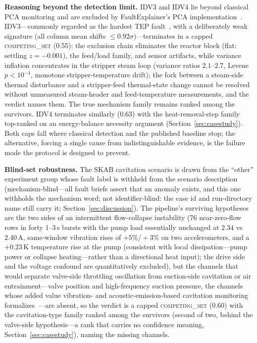 \documentclass[preprint,10pt]{elsarticle}
\begin{document}
\textbf{Reasoning beyond the detection limit.} IDV3 and IDV4 lie beyond classical PCA monitoring and are excluded by FaultExplainer's PCA implementation~\cite{russell2000delay,chiang2001fault,khan2024faultexplainer}. IDV3---commonly regarded as the hardest TEP fault~\cite{russell2000delay}, with a deliberately weak signature (all column mean shifts $\le 0.92\sigma$)---terminates in a capped \mbox{\textsc{competing\_set}} (0.55): the exclusion chain eliminates the reactor block (flat: settling $z{=}{-}0.001$), the feed/load family, and sensor artifacts, while variance inflation concentrates in the stripper steam loop (variance ratios $2.1$--$2.7$, Levene $p{<}10^{-4}$, monotone stripper-temperature drift); the fork between a steam-side thermal disturbance and a stripper-feed thermal-state change cannot be resolved without unmeasured steam-header and feed-temperature measurements, and the verdict names them. The true mechanism family remains ranked among the survivors. IDV4 terminates similarly (0.63) with the heat-removal-step family top-ranked on an energy-balance necessity argument (Section~\ref{sec:casestudy}). Both caps fall where classical detection and the published baseline stop; the alternative, forcing a single cause from indistinguishable evidence, is the failure mode the protocol is designed to prevent.

\textbf{Blind-set robustness.} The SKAB cavitation scenario is drawn from the ``other'' experiment group whose fault label is withheld from the scenario description (mechanism-blind---all fault briefs assert that an anomaly exists, and this one withholds the mechanism word; not identifier-blind: the case id and run-directory name still carry it; Section~\ref{sec:discussion}). The pipeline's surviving hypotheses are the two sides of an intermittent flow-collapse instability (76 near-zero-flow rows in forty 1--3\,s bursts with the pump load essentially unchanged at $2.34$ vs $2.40$\,A, same-window vibration rises of $+5\%/+3\%$ on two accelerometers, and a $+0.23$\,K temperature rise at the pump (consistent with local dissipation---pump power or collapse heating---rather than a directional heat input); the drive side and the voltage confound are quantitatively excluded), but the channels that would separate valve-side throttling oscillation from suction-side cavitation or air entrainment---valve position and high-frequency suction pressure, the channels whose added value vibration- and acoustic-emission-based cavitation monitoring formalizes~\cite{alfayez2005detection}---are absent, so the verdict is a capped \mbox{\textsc{competing\_set}} (0.60) with the cavitation-type family ranked among the survivors (second of two, behind the valve-side hypothesis---a rank that carries no confidence meaning, Section~\ref{sec:casestudy}), naming the missing channels.
\end{document}
